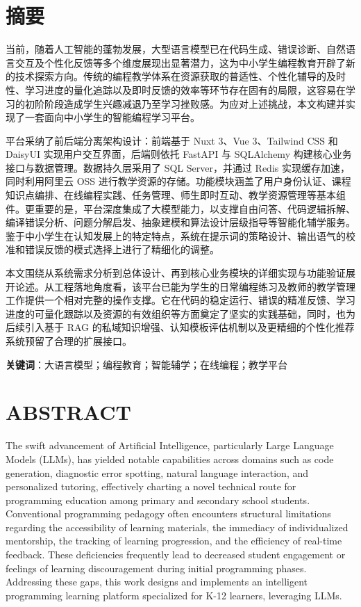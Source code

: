 
\chapter*{摘要}\label{ux6458ux8981}

当前，随着人工智能的蓬勃发展，大型语言模型已在代码生成、错误诊断、自然语言交互及个性化反馈等多个维度展现出显著潜力，这为中小学生编程教育开辟了新的技术探索方向。传统的编程教学体系在资源获取的普适性、个性化辅导的及时性、学习进度的量化追踪以及即时反馈的效率等环节存在固有的局限，这容易在学习的初阶阶段造成学生兴趣减退乃至学习挫败感。为应对上述挑战，本文构建并实现了一套面向中小学生的智能编程学习平台。

平台采纳了前后端分离架构设计：前端基于 Nuxt 3、Vue 3、Tailwind CSS 和 DaisyUI 实现用户交互界面，后端则依托 FastAPI 与 SQLAlchemy 构建核心业务接口与数据管理。数据持久层采用了 SQL Server，并通过 Redis 实现缓存加速，同时利用阿里云 OSS 进行教学资源的存储。功能模块涵盖了用户身份认证、课程知识点编排、在线编程实践、任务管理、师生即时互动、教学资源管理等基本组件。更重要的是，平台深度集成了大模型能力，以支撑自由问答、代码逻辑拆解、编译错误分析、问题分解启发、抽象建模和算法设计层级指导等智能化辅学服务。鉴于中小学生在认知发展上的特定特点，系统在提示词的策略设计、输出语气的校准和错误反馈的模式选择上进行了精细化的调整。

本文围绕从系统需求分析到总体设计、再到核心业务模块的详细实现与功能验证展开论述。从工程落地角度看，该平台已能为学生的日常编程练习及教师的教学管理工作提供一个相对完整的操作支撑。它在代码的稳定运行、错误的精准反馈、学习进度的可量化跟踪以及资源的有效组织等方面奠定了坚实的实践基础，同时，也为后续引入基于 RAG 的私域知识增强、认知模板评估机制以及更精细的个性化推荐系统预留了合理的扩展接口。

\textbf{关键词}：大语言模型；编程教育；智能辅学；在线编程；教学平台

\chapter*{ABSTRACT}\label{abstract}

The swift advancement of Artificial Intelligence, particularly Large Language Models (LLMs), has yielded notable capabilities across domains such as code generation, diagnostic error spotting, natural language interaction, and personalized tutoring, effectively charting a novel technical route for programming education among primary and secondary school students. Conventional programming pedagogy often encounters structural limitations regarding the accessibility of learning materials, the immediacy of individualized mentorship, the tracking of learning progression, and the efficiency of real-time feedback. These deficiencies frequently lead to decreased student engagement or feelings of learning discouragement during initial programming phases. Addressing these gaps, this work designs and implements an intelligent programming learning platform specialized for K-12 learners, leveraging LLMs.

